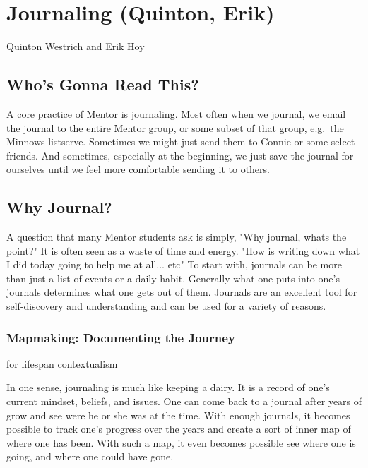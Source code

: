 \chapter{Journaling (Quinton, Erik)}

\begin{authors}
	Quinton Westrich and Erik Hoy
\end{authors}

\section{Who's Gonna Read This?}

A core practice of Mentor is journaling. Most often when we journal, we email the journal to the entire Mentor group, or some subset of that group, e.g.\ the Minnows listserve. Sometimes we might just send them to Connie or some select friends. And sometimes, especially at the beginning, we just save the journal for ourselves until we feel more comfortable sending it to others.


\section{Why Journal?}


A question that many Mentor students ask is simply, "Why journal,
whats the point?" It is often seen as a waste of time and energy. "How
is writing down what I did today going to help me at all... etc" To
start with, journals can be more than just a list of events or a daily
habit. Generally what one puts into one's journals determines what one
gets out of them. Journals are an excellent tool for self-discovery
and understanding and can be used for a variety of reasons.


\subsection{Mapmaking: Documenting the Journey}

for lifespan contextualism

In one sense, journaling is much like keeping a dairy. It is a record
of one's current mindset, beliefs, and issues. One can come back to a
journal after years of grow and see were he or she was at the time.
With enough journals, it becomes possible to track one's progress over
the years and create a sort of inner map of where one has been. With
such a map, it even becomes possible see where one is going, and where
one could have gone.


